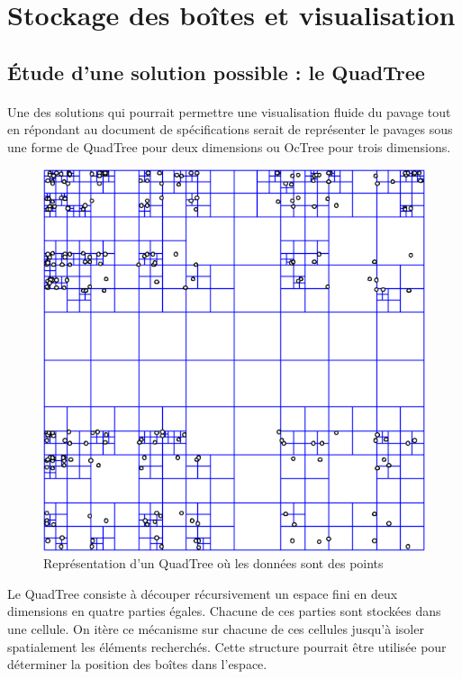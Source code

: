 \section{Stockage des boîtes et visualisation}

\subsection{\'Etude d'une solution possible : le QuadTree}
\paragraph{}Une des solutions qui pourrait permettre une visualisation fluide du pavage tout en répondant au document de spécifications serait de représenter le pavages sous une forme de QuadTree pour deux dimensions ou OcTree pour trois dimensions.
\begin{figure}[htbp]
\centering
\includegraphics[scale=0.50]{img/quadtree}
\caption{Représentation d'un QuadTree où les données sont des points}

\end{figure}

Le QuadTree consiste à découper récursivement un espace fini en deux dimensions en quatre parties égales. Chacune de ces parties sont stockées dans une cellule. On itère ce mécanisme sur chacune de ces cellules jusqu'à isoler spatialement les éléments recherchés.
Cette structure pourrait être utilisée pour déterminer la position des boîtes dans l'espace.

